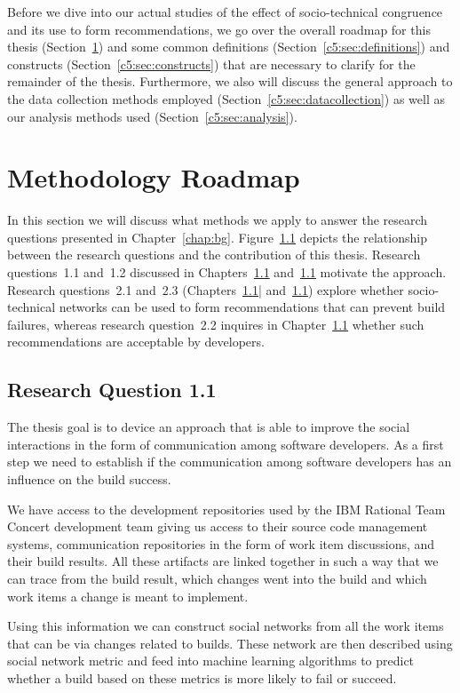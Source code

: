 \label{chap:meth}
Before we dive into our actual studies of the effect of socio-technical congruence and its use to form recommendations, we go over the overall roadmap for this thesis (Section~\ref{c5:sec:roadmap}) and some common definitions (Section~\ref{c5:sec:definitions}) and constructs (Section~\ref{c5:sec:constructs}) that are necessary to clarify for the remainder of the thesis.
Furthermore, we also will discuss the general approach to the data collection methods employed (Section~\ref{c5:sec:datacollection}) as well as our analysis methods used (Section~\ref{c5:sec:analysis}).

\section{Methodology Roadmap}
\label{c5:sec:roadmap}
In this section we will discuss what methods we apply to answer the research questions presented in Chapter~\ref{chap:bg}.
Figure~\ref{} depicts the relationship between the research questions and the contribution of this thesis.
Research questions~1.1 and~1.2 discussed in Chapters~\ref{} and~\ref{} motivate the approach.
Research questions~2.1 and~2.3 (Chapters~\ref{}| and~\ref{}) explore whether socio-technical networks can be used to form recommendations that can prevent build failures, whereas research question~2.2 inquires in Chapter~\ref{} whether such recommendations are acceptable by developers.

\subsection{Research Question 1.1}
The thesis goal is to device an approach that is able to improve the social interactions in the form of communication among software developers.
As a first step we need to establish if the communication among software developers has an influence on the build success.

We have access to the development repositories used by the IBM Rational Team Concert development team giving us access to their source code management systems, communication repositories in the form of work item discussions, and their build results.
All these artifacts are linked together in such a way that we can trace from the build result, which changes  went into the build and which work items a change is meant to implement.

Using this information we can construct social networks from all the work items that can be via changes related to builds.
These network are then described using social network metric and feed into machine learning algorithms to predict whether a build based on these metrics is more likely to fail or succeed.

